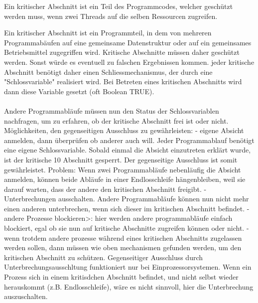 \begin{answer}
Ein kritischer Abschnitt ist ein Teil des Programmcodes, welcher geschützt werden muss, wenn zwei Threads auf die selben Ressourcen zugreifen.

Ein kritischer Abschnitt ist ein Programmteil, in dem von mehreren Programmabäufen auf eine gemeinsame
Datenstruktur oder auf ein gemeinsames Betriebsmittel zugegriffen wird. Kritische Abschnitte müssen daher geschützt werden. Sonst würde es eventuell zu falschen Ergebnissen kommen. jeder kritische Abschnitt benötigt daher einen Schliessmechanismus, der durch eine "Schlossvariable" realisiert wird. Bei Betreten eines kritischen Abschnitts wird dann diese Variable gesetzt (oft Boolean TRUE).

\paragraph*{}
Andere Programmabläufe müssen nun den Status der Schlossvariablen nachfragen,
um zu erfahren, ob der kritische Abschnitt frei ist oder nicht.
Möglichkeiten, den gegenseitigen Ausschluss zu gewährleisten:
- eigene Absicht anmelden, dann überprüfen ob anderer auch will. Jeder Programmablauf benötigt
eine eigene Schlossvariable. Sobald einmal die Absicht einzutreten erklärt wurde, ist der kritische
10
Abschnitt gesperrt. Der gegenseitige Ausschluss ist somit gewährleistet.
Problem: Wenn zwei Programmabläufe nebenläufig die Absicht anmelden, können beide Abläufe
in einer Endlosschleife hängenbleiben, weil sie darauf warten, dass der andere den kritischen Abschnitt
freigibt.
- Unterbrechungen ausschalten. Andere Programmabläufe können nun nicht mehr einen anderen
unterbrechen, wenn sich dieser im kritischen Abschnitt befindet.
- andere Prozesse blockieren>: hier werden andere programmabläufe einfach blockiert, egal ob sie
nun auf kritische Abschnitte zugreifen können oder nicht.
- wenn trotdem andere prozesse während eines kritischen Abschnitts zugelassen werden sollen,
dann müssen wie oben mechanismen gefunden werden, um den kritischen Abschnitt zu schützen.
Gegenseitiger Ausschluss durch Unterbrechungsausschltung funktioniert nur bei Einprozessorsystemen.
Wenn ein Prozess sich in einem kritisdchen Abschnitt befindet, und nicht selbst wieder
herauskommt (z.B. Endlosschleife), wäre es nicht sinnvoll, hier die Unterbrechung auszuschalten.
\end{answer}


